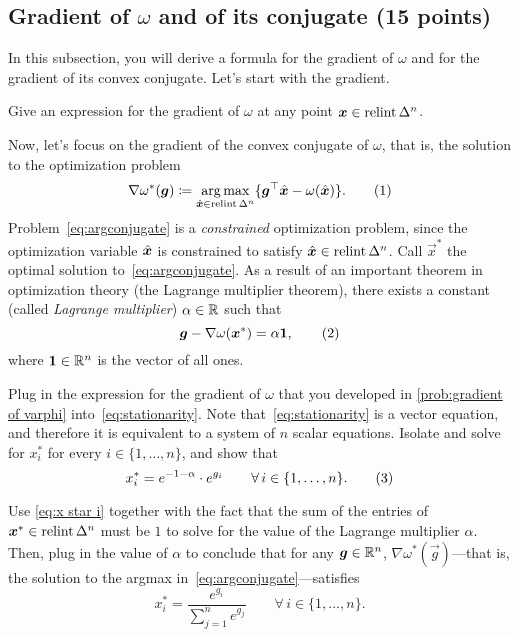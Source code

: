 \documentclass{homework}
\newcommand{\negent}{\omega}
\begin{document}
\subsection{Gradient of $\negent$ and of its conjugate (15 points)}

In this subsection, you will derive a formula for the gradient of $\negent$ and for the gradient of its convex conjugate. Let's start with the gradient.

\begin{problem}[5 points]\label{prob:gradient of varphi}
    Give an expression for the gradient of $\negent$ at any point $\bm{x} \in \operatorname{relint}\Delta^n$.
\end{problem}
\begin{solution}
\end{solution}

Now, let's focus on the gradient of the convex conjugate of $\negent$, that is, the solution to the optimization problem 
\[
    \nabla\negent^*(\vec{g}) \defeq \argmax_{\xhat\in\relint\Delta^n} \{\vec{g}^\top \xhat - \negent(\xhat)\}.
    \numberthis{eq:argconjugate}
\]
Problem~\eqref{eq:argconjugate} is a \emph{constrained} optimization problem, since the optimization variable $\hat{\bm{x}}$ is constrained to satisfy $\hat{\bm{x}} \in \operatorname{relint}\Delta^n$. Call $\vec{x}^*$ the optimal solution to~\eqref{eq:argconjugate}. As a result of an important theorem in optimization theory (the Lagrange multiplier theorem), there exists a constant (called \emph{Lagrange multiplier}) $\alpha \in \mathbb{R}$ such that
\[
    \vec{g} - \nabla\negent(\vec{x}^*) = \alpha \vec{1},
    \numberthis{eq:stationarity}
\]
where $\bm{1} \in \mathbb{R}^n$ is the vector of all ones.

\begin{problem}[5 points]
    Plug in the expression for the gradient of $\negent$ that you developed in \cref{prob:gradient of varphi} into~\eqref{eq:stationarity}. Note that~\eqref{eq:stationarity} is a vector equation, and therefore it is equivalent to a system of $n$ scalar equations. Isolate and solve for $x^*_i$ for every $i \in \{1,\dots,n\}$, and show that 
    \[
        x_i^* = e^{-1-\alpha} \cdot e^{g_i} \qquad\forall\, i \in \{1,\dots,n\}. 
        \numberthis{eq:x star i}
    \]
\end{problem}
\begin{solution}
\end{solution}

\begin{problem}[5 points]\label{prob:argconj of entropy}
    Use \cref{eq:x star i} together with the fact that the sum of the entries of $\bm{x}^* \in \operatorname{relint}\Delta^n$ must be $1$ to solve for the value of the Lagrange multiplier $\alpha$. Then, plug in the value of $\alpha$ to conclude that for any $\bm{g}\in\mathbb{R}^n$, $\nabla\negent^*(\vec{g})$---that is, the solution to the argmax in~\eqref{eq:argconjugate}---satisfies
    \[
        x^*_i = \frac{e^{g_i}}{\sum_{j=1}^n e^{g_j}} \qquad\forall\, i \in \{1,\dots,n\}.
    \]
\end{problem}
\begin{solution}
\end{solution}
\end{document}
